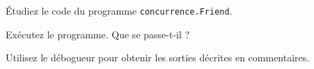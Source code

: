 
\begingroup

\begin{exercice}[Vivacité]

  Étudiez le code du programme \texttt{concurrence.Friend}.
  
  \begin{questions} 
  \item Exécutez le programme. Que se passe-t-il ?
  \item Utilisez le débogueur pour obtenir les sorties décrites en commentaires.
  \end{questions}

\end{exercice}

\endgroup
\endinput
